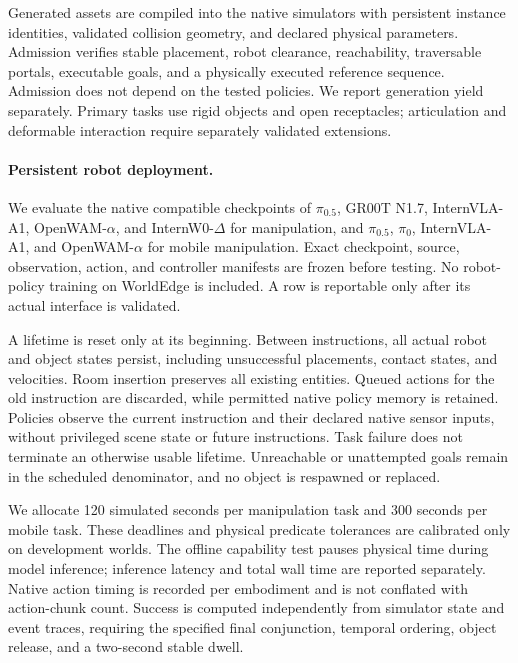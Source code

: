 Generated assets are compiled into the native simulators with persistent
instance identities, validated collision geometry, and declared physical
parameters. Admission verifies stable placement, robot clearance,
reachability, traversable portals, executable goals, and a physically
executed reference sequence. Admission does not depend on the tested
policies. We report generation yield separately. Primary tasks use rigid
objects and open receptacles; articulation and deformable interaction require
separately validated extensions.

\paragraph{Persistent robot deployment.}
We evaluate the native compatible checkpoints of $\pi_{0.5}$, GR00T N1.7,
InternVLA-A1, OpenWAM-$\alpha$, and InternW0-$\Delta$ for manipulation, and
$\pi_{0.5}$, $\pi_0$, InternVLA-A1, and OpenWAM-$\alpha$ for mobile
manipulation. Exact checkpoint, source, observation, action, and controller
manifests are frozen before testing. No robot-policy training on WorldEdge
is included. A row is reportable only after its actual interface is validated.

A lifetime is reset only at its beginning. Between instructions, all actual
robot and object states persist, including unsuccessful placements, contact
states, and velocities. Room insertion preserves all existing entities.
Queued actions for the old instruction are discarded, while permitted native
policy memory is retained. Policies observe the current instruction and
their declared native sensor inputs, without privileged scene state or
future instructions. Task failure does not terminate an otherwise usable
lifetime. Unreachable or unattempted goals remain in the scheduled
denominator, and no object is respawned or replaced.

We allocate 120 simulated seconds per manipulation task and 300 seconds per
mobile task. These deadlines and physical predicate tolerances are calibrated
only on development worlds. The offline capability test pauses physical time
during model inference; inference latency and total wall time are reported
separately. Native action timing is recorded per embodiment and is not
conflated with action-chunk count. Success is computed independently from
simulator state and event traces, requiring the specified final conjunction,
temporal ordering, object release, and a two-second stable dwell.

